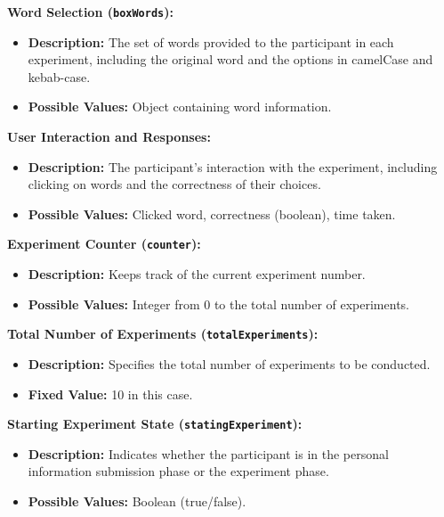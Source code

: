 \documentclass{article}
\begin{document}
\begin{tcolorbox}[title=Dependent Variables]

\textbf{Word Selection (\texttt{boxWords}):}
\begin{itemize}
    \item \textbf{Description:} The set of words provided to the participant in each experiment, including the original word and the options in camelCase and kebab-case.
    \item \textbf{Possible Values:} Object containing word information.
\end{itemize}

\textbf{User Interaction and Responses:}
\begin{itemize}
    \item \textbf{Description:} The participant's interaction with the experiment, including clicking on words and the correctness of their choices.
    \item \textbf{Possible Values:} Clicked word, correctness (boolean), time taken.
\end{itemize}

\textbf{Experiment Counter (\texttt{counter}):}
\begin{itemize}
    \item \textbf{Description:} Keeps track of the current experiment number.
    \item \textbf{Possible Values:} Integer from 0 to the total number of experiments.
\end{itemize}

\end{tcolorbox}

\begin{tcolorbox}[title=Control Variables]

\textbf{Total Number of Experiments (\texttt{totalExperiments}):}
\begin{itemize}
    \item \textbf{Description:} Specifies the total number of experiments to be conducted.
    \item \textbf{Fixed Value:} 10 in this case.
\end{itemize}

\textbf{Starting Experiment State (\texttt{statingExperiment}):}
\begin{itemize}
    \item \textbf{Description:} Indicates whether the participant is in the personal information submission phase or the experiment phase.
    \item \textbf{Possible Values:} Boolean (true/false).
\end{itemize}

\end{tcolorbox}
\end{document}
